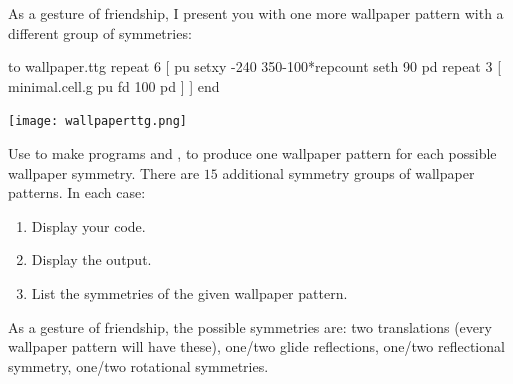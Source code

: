 \documentclass[noauthor,nooutcomes,12pt]{ximera}
\begin{document}
\begin{multicols*}{2}
As a gesture of friendship, I present you with one more wallpaper
pattern with a different group of symmetries:
\begin{logo}
to wallpaper.ttg repeat 6 [
pu setxy -240 350-100*repcount seth 90 pd 
repeat 3 [
  minimal.cell.g pu fd 100 pd ] ]
end
\end{logo}
\begin{logoout}
    \texttt{[image: wallpaperttg.png]}
\end{logoout}
\enlargethispage{\baselineskip}
\end{multicols*}
\newpage


\begin{problem}
  Use  to make programs  and
  , to produce one wallpaper pattern for each possible
  wallpaper symmetry. There are $15$ additional symmetry groups of
  wallpaper patterns. In each case:
  \begin{enumerate}
  \item Display your code. 
  \item Display the output.
  \item List the symmetries of the given wallpaper pattern.
  \end{enumerate}
  As a gesture of friendship, the possible symmetries are: two
  translations (every wallpaper pattern will have these), one/two
  glide reflections, one/two reflectional symmetry, one/two rotational symmetries.
  
\end{problem}
\end{document}
